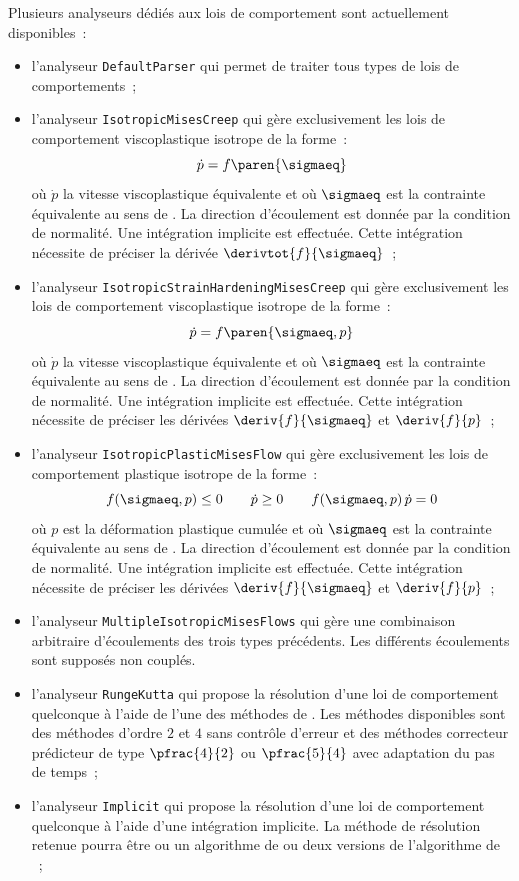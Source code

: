 \documentclass[rectoverso,pleiades,pstricks,leqno,anti]{texmf/note_technique_2010}
\begin{document}
Plusieurs analyseurs dédiés aux lois de comportement sont actuellement
disponibles~:
\begin{itemize}
  \item l'analyseur \texttt{DefaultParser} qui permet de traiter tous
  types de lois de comportements~;
  \item l'analyseur \texttt{IsotropicMisesCreep} qui gère exclusivement
  les lois de comportement viscoplastique isotrope de la forme~:
  \[
  \dot{p} = f\paren{\sigmaeq}
  \]
  où \(\dot{p}\) la vitesse viscoplastique équivalente et où
  \(\sigmaeq\) est la contrainte équivalente au sens de .
  La direction d'écoulement est donnée par la condition de normalité.
  Une intégration implicite est effectuée. Cette intégration nécessite
  de préciser la dérivée \(\derivtot{f}{\sigmaeq}\)~;
  \item l'analyseur \texttt{IsotropicStrainHardeningMisesCreep} qui gère
  exclusivement les lois de comportement viscoplastique isotrope de
  la forme~:
  \[
  \dot{p} = f\paren{\sigmaeq,p}
  \]
  où \(\dot{p}\) la vitesse viscoplastique équivalente et où
  \(\sigmaeq\) est la contrainte équivalente au sens de .
  La direction d'écoulement est donnée par la condition de normalité.
  Une intégration implicite est effectuée. Cette intégration nécessite
  de préciser les dérivées \(\deriv{f}{\sigmaeq}\) et \(\deriv{f}{p}\)~;
  \item l'analyseur \texttt{IsotropicPlasticMisesFlow} qui gère
  exclusivement les lois de comportement plastique isotrope de la
  forme~:
  \[
  f(\sigmaeq,p)\leq 0 \quad\quad \dot{p}\geq 0 \quad\quad
  f(\sigmaeq,p)\,\dot{p} = 0
  \]
  où \(p\) est la déformation plastique cumulée et où \(\sigmaeq\) est
  la contrainte équivalente au sens de . La direction
  d'écoulement est donnée par la condition de normalité. Une intégration
  implicite est effectuée. Cette intégration nécessite de préciser les
  dérivées \(\deriv{f}{\sigmaeq}\) et \(\deriv{f}{p}\)~;
  \item l'analyseur \texttt{MultipleIsotropicMisesFlows} qui gère une
  combinaison arbitraire d'écoulements des trois types précédents. Les
  différents écoulements sont supposés non couplés.
  \item l'analyseur \texttt{RungeKutta} qui propose la résolution d'une
  loi de comportement quelconque à l'aide de l'une des méthodes de
  . Les méthodes disponibles sont des méthodes d'ordre
  \(2\) et \(4\) sans contrôle d'erreur et des méthodes correcteur
  prédicteur de type \(\pfrac{4}{2}\) ou \(\pfrac{5}{4}\) avec
  adaptation du pas de temps~;
  \item l'analyseur \texttt{Implicit} qui propose la résolution d'une
  loi de comportement quelconque à l'aide d'une intégration implicite.
  La méthode de résolution retenue pourra être ou un algorithme de
   ou deux versions de l'algorithme de
  ~;
\end{itemize}
\end{document}
